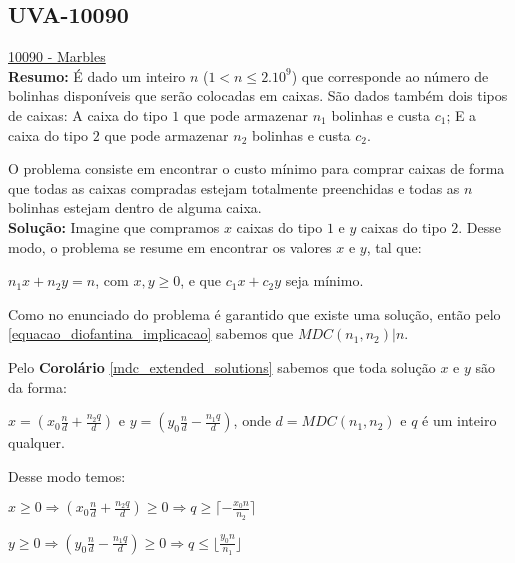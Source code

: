 \subsection{UVA-10090}
\href{https://uva.onlinejudge.org/index.php?option=onlinejudge&page=show_problem&problem=1031}{10090 - Marbles}\\


\textbf{Resumo:}
É dado um inteiro $n$ ($1 < n \leq 2.10^9$) que corresponde ao número de bolinhas disponíveis que serão colocadas em caixas. São dados também dois tipos de caixas:
A caixa do tipo $1$ que pode armazenar $n_1$ bolinhas e custa $c_1$; E a caixa do tipo $2$ que pode armazenar $n_2$ bolinhas e custa $c_2$.

O problema consiste em encontrar o custo mínimo para comprar caixas de forma que todas as caixas compradas estejam totalmente
 preenchidas e todas as $n$ bolinhas estejam dentro de alguma caixa.
\\

\textbf{Solução:}
Imagine que compramos $x$ caixas do tipo $1$ e $y$ caixas do tipo $2$. Desse modo, o problema se resume em encontrar os valores $x$ e $y$, tal que: 
\newline

$n_1x + n_2y = n$, com $x,y\geq 0$, e que $c_1x+c_2y$ seja mínimo.
\newline 

Como no enunciado do problema é garantido que existe uma solução, então pelo \autoref{equacao_diofantina_implicacao} sabemos que $MDC(n_1,n_2) | n$.

Pelo \textbf{Corolário} \autoref{mdc_extended_solutions} sabemos que toda solução $x$ e $y$ são da forma:

$x=(x_0\frac{n}{d} + \frac{n_2q}{d})$ e $y =(y_0\frac{n}{d} - \frac{n_1q}{d})$, onde $d = MDC(n_1,n_2)$ e $q$ é um inteiro qualquer.

Desse modo temos:
\newline

$x\geq0 \Rightarrow (x_0\frac{n}{d} + \frac{n_2q}{d})\geq 0 \Rightarrow q \geq \lceil -\frac{x_0n}{n_2} \rceil$
\newline

$y\geq0 \Rightarrow (y_0\frac{n}{d} - \frac{n_1q}{d}) \geq 0 \Rightarrow q \leq \lfloor \frac{y_0n}{n_1} \rfloor$
\newline

